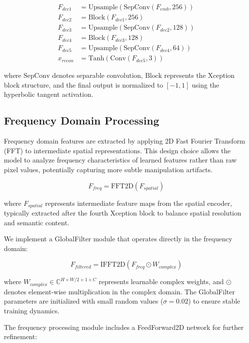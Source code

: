 \documentclass[letterpaper]{article} %
\begin{document}
\begin{align}
F_{dec1} &= \text{Upsample}(\text{SepConv}(F_{emb}, 256)) \\
F_{dec2} &= \text{Block}(F_{dec1}, 256) \\
F_{dec3} &= \text{Upsample}(\text{SepConv}(F_{dec2}, 128)) \\
F_{dec4} &= \text{Block}(F_{dec3}, 128) \\
F_{dec5} &= \text{Upsample}(\text{SepConv}(F_{dec4}, 64)) \\
x_{recon} &= \text{Tanh}(\text{Conv}(F_{dec5}, 3))
\end{align}

where $\text{SepConv}$ denotes separable convolution, $\text{Block}$ represents the Xception block structure, and the final output is normalized to $[-1, 1]$ using the hyperbolic tangent activation.

\subsection{Frequency Domain Processing}

Frequency domain features are extracted by applying 2D Fast Fourier Transform (FFT) to intermediate spatial representations. This design choice allows the model to analyze frequency characteristics of learned features rather than raw pixel values, potentially capturing more subtle manipulation artifacts.

\begin{equation}
F_{freq} = \text{FFT2D}(F_{spatial})
\end{equation}

where $F_{spatial}$ represents intermediate feature maps from the spatial encoder, typically extracted after the fourth Xception block to balance spatial resolution and semantic content.

We implement a GlobalFilter module that operates directly in the frequency domain:

\begin{equation}
F_{filtered} = \text{IFFT2D}(F_{freq} \odot W_{complex})
\end{equation}

where $W_{complex} \in \mathbb{C}^{H \times W/2+1 \times C}$ represents learnable complex weights, and $\odot$ denotes element-wise multiplication in the complex domain. The GlobalFilter parameters are initialized with small random values ($\sigma = 0.02$) to ensure stable training dynamics.

The frequency processing module includes a FeedForward2D network for further refinement:
\end{document}

